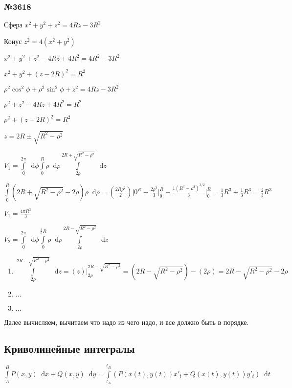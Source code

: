 \documentclass{article}
\newcommand*\diff{\mathop{}\!\mathrm{d}}
\begin{document}
\subsubsection{№3618}

Сфера $x^2 + y^2 + z^2 = 4 R z - 3R^2$

Конус $z^2 = 4 (x^2 + y^2)$

$x^2 + y^2 + z^2 - 4Rz+4R^2 = 4R^2 - 3R^2$

$x^2 + y^2 + (z - 2R)^2 = R^2$

$\rho^2 \cos^2 \phi + \rho^2 \sin^2 \phi + z^2 = 4 R z - 3R^2$

$\rho^2 + z^2 - 4 R z + 4 R^2 = R^2$

$\rho^2 + (z - 2R)^2 = R^2$

$z = 2R \pm \sqrt{R^2 - \rho^2}$

$V_1 = \int\limits_{0}^{2 \pi} \diff \phi \int\limits_{0}^{R} \rho \diff \rho \int\limits_{2 \rho}^{2 R + \sqrt{R^2 - \rho^2}} \diff z$

$\int\limits_{0}^{R} (2R + \sqrt{R^2 -\rho^2} - 2 \rho) \rho \diff \rho = (\frac{2R \rho^2}{2}) \bigg|{0}^{R} - \frac{2 \rho^3}{3} \bigg|_{0}^{R} - \frac{1 (R^2 - \rho^2)^{3/2}}{3} \bigg|_{0}^{R} = \frac{1}{3} R^3 + \frac{1}{3} R^3 = \frac{2}{3} R^3$

$V_1 = \frac{4 \pi R^3}{3}$

$V_2 = \int\limits_{0}^{2 \pi} \diff \phi \int\limits_{0}^{\frac{3}{5} R} \rho \diff \rho \int\limits_{2 \rho}^{2 R - \sqrt{R^2 - \rho^2}} \diff z$

\begin{enumerate}
    \item $\int\limits_{2 \rho}^{2 R - \sqrt{R^2 - \rho^2}} \diff z = (z) \bigg|_{2 \rho}^{2 R - \sqrt{R^2 - \rho^2}} = (2R - \sqrt{R^2 - \rho^2}) - (2 \rho) = 2R - \sqrt{R^2 - \rho^2} - 2\rho$
    \item $\dots$
    \item $\dots$
\end{enumerate}

Далее вычисляем, вычитаем что надо из чего надо, и все должно быть в порядке.

\subsection{Криволинейные интегралы}

$\int\limits_{A}^{B} P(x, y) \diff x + Q(x, y) \diff y = \int\limits_{t_{A}}^{t_{B}} (P(x(t), y(t)) x'_t + Q(x(t), y(t)) y'_t) \diff t$
\end{document}
